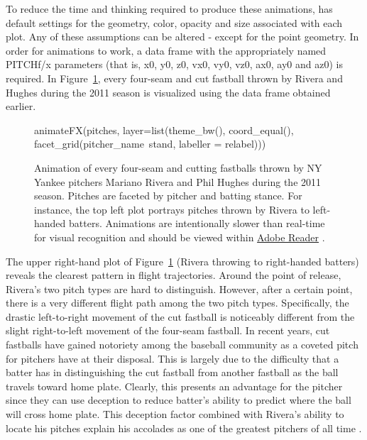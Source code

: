 \begin{article}
To reduce the time and thinking required to produce these animations,
 has default settings for the geometry, color, opacity
and size associated with each plot. Any of these assumptions can be
altered - except for the point geometry. In order for animations to
work, a data frame with the appropriately named PITCHf/x parameters
(that is, x0, y0, z0, vx0, vy0, vz0, ax0, ay0 and az0) is required.
In Figure~\ref{fig:animate1}, every four-seam and cut fastball thrown
by Rivera and Hughes during the 2011 season is visualized using the
 data frame obtained earlier.




\begin{figure}[h]
%
\begin{Schunk}
\begin{Sinput}
animateFX(pitches, layer=list(theme_bw(), coord_equal(),
  facet_grid(pitcher_name~stand, labeller = relabel)))
\end{Sinput}

\end{Schunk}
%

\caption{\label{fig:animate1}Animation of every four-seam and cutting fastballs
thrown by NY Yankee pitchers Mariano Rivera and Phil Hughes during
the 2011 season. Pitches are faceted by pitcher and batting stance.
For instance, the top left plot portrays pitches thrown by Rivera
to left-handed batters. Animations are intentionally slower than real-time
for visual recognition and should be viewed within \protect\href{http://get.adobe.com/reader/}{Adobe Reader}
\citep{knitr}.}
\end{figure}


The upper right-hand plot of Figure~\ref{fig:animate1} (Rivera throwing
to right-handed batters) reveals the clearest pattern in flight trajectories.
Around the point of release, Rivera's two pitch types are hard to
distinguish. However, after a certain point, there is a very different
flight path among the two pitch types. Specifically, the drastic left-to-right
movement of the cut fastball is noticeably different from the slight
right-to-left movement of the four-seam fastball. In recent years,
cut fastballs have gained notoriety among the baseball community as
a coveted pitch for pitchers have at their disposal. This is largely
due to the difficulty that a batter has in distinguishing the cut
fastball from another fastball as the ball travels toward home plate.
Clearly, this presents an advantage for the pitcher since they can
use deception to reduce batter's ability to predict where the ball
will cross home plate. This deception factor combined with Rivera's
ability to locate his pitches explain his accolades as one of the
greatest pitchers of all time \citep{NYT}.


\end{article}
